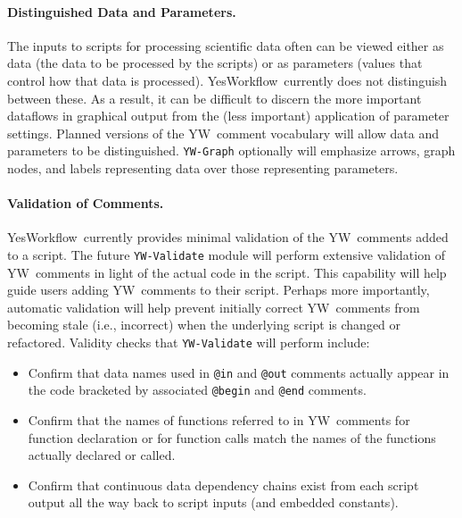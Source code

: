 \documentclass{article}
\newcommand{\YW}{\textsf{YesWorkflow}}
\newcommand{\yw}{\textsf{YW}}
\newcommand{\ywa}[1]{\texttt{#1}}
\newcommand{\ywm}[1]{\texttt{#1}}
\begin{document}

\paragraph{Distinguished Data and Parameters.}
The inputs to scripts for processing scientific data often can be
viewed either as data (the data to be processed by the scripts) or as
parameters (values that control how that data is processed). \YW\
currently does not distinguish between these. As a result, it can be
difficult to discern the more important dataflows in graphical output
from the (less important) application of parameter settings. Planned
versions of the \yw\ comment vocabulary will allow data and parameters
to be distinguished. \ywm{YW-Graph} optionally will emphasize arrows, graph
nodes, and labels representing data over those representing
parameters.


\paragraph{Validation of Comments.}
\YW\ currently provides minimal validation of the \yw\ comments added
to a script. The future \ywm{YW-Validate} module will perform
extensive validation of \yw\ comments in light of the actual code in
the script.  This capability will help guide users adding \yw\
comments to their script. Perhaps more importantly, automatic
validation will help prevent initially correct \yw\ comments from
becoming stale (i.e., incorrect) when the underlying script is changed
or refactored.
%
Validity checks that \ywm{YW-Validate} will perform include:
\begin{itemize} 
\item Confirm that data names used in \ywa{@in} and \ywa{@out} comments
actually appear in the code bracketed by associated \ywa{@begin} and  \ywa{@end}
  comments.
\item Confirm that the names of functions referred to in \yw\ comments
  for function declaration or for function calls match the names of
  the functions actually declared or called.
\item Confirm that  continuous data dependency chains exist from each script output all
  the way back to script inputs (and embedded constants).
\end{itemize}
\end{document}
